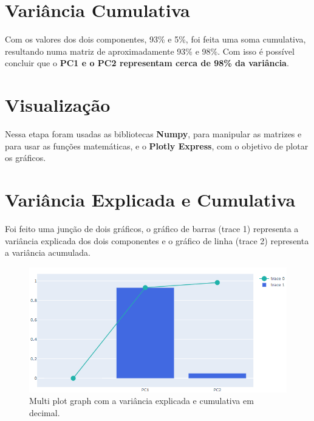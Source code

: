 \documentclass{article}
\begin{document}
\section*{Variância Cumulativa}
\begin{flushleft}
    Com os valores dos dois componentes, 93\% e 5\%, foi feita uma soma cumulativa, resultando numa matriz de aproximadamente 93\% e 98\%. Com isso é possível concluir que o \textbf{PC1 e o PC2 representam cerca de 98\% da variância}.
\end{flushleft}

\newpage

\section{Visualização}
\begin{flushleft}
    Nessa etapa foram usadas as bibliotecas \textbf{Numpy}, para manipular as matrizes e para usar as funções matemáticas, e o \textbf{Plotly Express}, com o objetivo de plotar os gráficos.
\end{flushleft}

\section*{Variância Explicada e Cumulativa}
\begin{flushleft}
    Foi feito uma junção de dois gráficos, o gráfico de barras (trace 1) representa a variância explicada dos dois componentes e o gráfico de linha (trace 2) representa a variância acumulada.
\end{flushleft}
\begin{figure}[h]
    \centering
    \includegraphics[scale=0.4]{varianciaexplicada}
    \caption{Multi plot graph com a variância explicada e cumulativa em decimal.}
    \label{fig:x cubed graph}
\end{figure}
\end{document}
